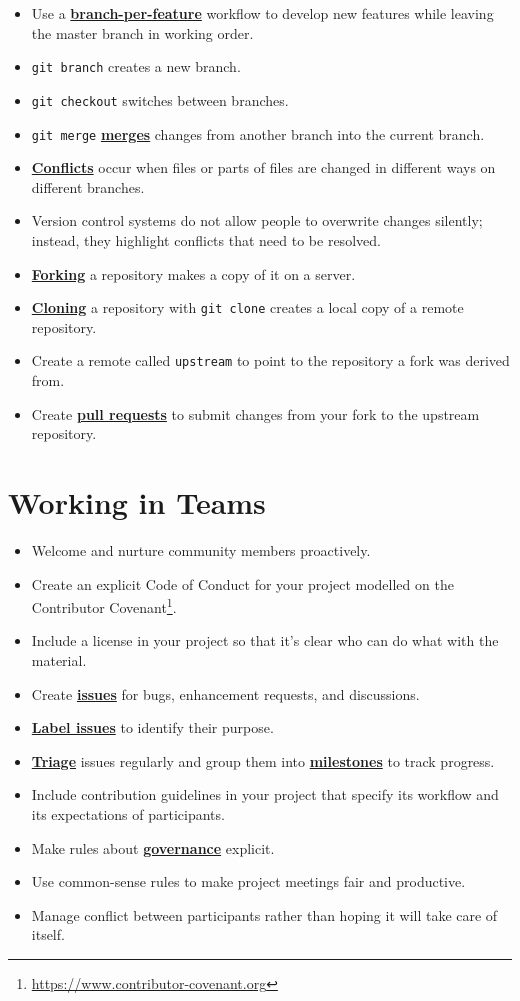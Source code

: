 \documentclass[
]{krantz}
\providecommand{\tightlist}{%
  \setlength{\itemsep}{0pt}\setlength{\parskip}{0pt}}
\renewcommand{\href}[2]{#2\footnote{\url{#1}}}
\newcommand{\gref}[2]{\hyperlink{#2}{\textbf{#1}}}
\begin{document}
\begin{itemize}
\tightlist
\item
  Use a \gref{branch-per-feature}{branch\_per\_feature} workflow to develop new features while leaving the master branch in working order.
\item
  \texttt{git\ branch} creates a new branch.
\item
  \texttt{git\ checkout} switches between branches.
\item
  \texttt{git\ merge} \gref{merges}{git\_merge} changes from another branch into the current branch.
\item
  \gref{Conflicts}{git\_conflict} occur when files or parts of files are changed in different ways on different branches.
\item
  Version control systems do not allow people to overwrite changes silently;
  instead, they highlight conflicts that need to be resolved.
\item
  \gref{Forking}{git\_fork} a repository makes a copy of it on a server.
\item
  \gref{Cloning}{git\_clone} a repository with \texttt{git\ clone} creates a local copy of a remote repository.
\item
  Create a remote called \texttt{upstream} to point to the repository a fork was derived from.
\item
  Create \gref{pull requests}{pull\_request} to submit changes from your fork to the upstream repository.
\end{itemize}

\hypertarget{working-in-teams-1}{%
\section{Working in Teams}\label{working-in-teams-1}}

\begin{itemize}
\tightlist
\item
  Welcome and nurture community members proactively.
\item
  Create an explicit Code of Conduct for your project modelled on the \href{https://www.contributor-covenant.org}{Contributor Covenant}.
\item
  Include a license in your project so that it's clear who can do what with the material.
\item
  Create \gref{issues}{issue} for bugs, enhancement requests, and discussions.
\item
  \gref{Label issues}{issue\_label} to identify their purpose.
\item
  \gref{Triage}{triage} issues regularly and group them into \gref{milestones}{milestone} to track progress.
\item
  Include contribution guidelines in your project that specify its workflow and its expectations of participants.
\item
  Make rules about \gref{governance}{governance} explicit.
\item
  Use common-sense rules to make project meetings fair and productive.
\item
  Manage conflict between participants rather than hoping it will take care of itself.
\end{itemize}
\end{document}
